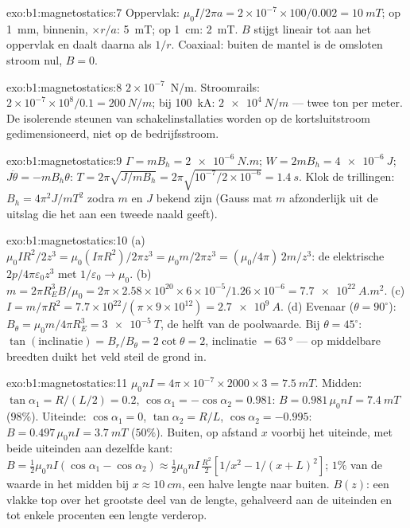 \begin{solution}{exo:b1:magnetostatics:7}
Oppervlak: $\mu_0I/2\pi a = 2 \times 10^{-7} \times 100/0.002 = \qty{10}{mT}$; op
\qty{1}{mm}, binnenin, $\times r/a$: \qty{5}{mT}; op \qty{1}{cm}: \qty{2}{mT}. $B$ stijgt
lineair tot aan het oppervlak en daalt daarna als $1/r$. Coaxiaal: buiten de mantel
is de omsloten stroom nul, $B = 0$.
\end{solution}

\begin{solution}{exo:b1:magnetostatics:8}
$2 \times 10^{-7}$~N/m. Stroomrails: $2 \times 10^{-7} \times 10^8/0.1 = \qty{200}{N/m}$;
bij \qty{100}{kA}: $\qty{2e4}{N/m}$ --- twee ton per meter. De isolerende
steunen van schakelinstallaties worden op de kortsluitstroom gedimensioneerd, niet op de
bedrijfsstroom.
\end{solution}

\begin{solution}{exo:b1:magnetostatics:9}
$\Gamma = mB_h = \qty{2e-6}{N.m}$; $W = 2mB_h = \qty{4e-6}{J}$; $J\ddot\theta =
-mB_h\theta$: $T = 2\pi\sqrt{J/mB_h} = 2\pi\sqrt{10^{-7}/2 \times 10^{-6}} =
\qty{1.4}{s}$. Klok de trillingen: $B_h = 4\pi^2J/mT^2$ zodra $m$ en $J$
bekend zijn (Gauss mat $m$ afzonderlijk uit de uitslag die het aan
een tweede naald geeft).
\end{solution}

\begin{solution}{exo:b1:magnetostatics:10}
(a) $\mu_0IR^2/2z^3 = \mu_0(I\pi R^2)/2\pi z^3 = \mu_0m/2\pi z^3 = (\mu_0/4\pi)\,2m/z^3$:
de elektrische $2p/4\pi\varepsilon_0z^3$ met $1/\varepsilon_0 \to \mu_0$. (b) $m = 2\pi R_E^3B/
\mu_0 = 2\pi \times 2.58 \times 10^{20} \times 6 \times 10^{-5}/1.26 \times 10^{-6} = \qty{7.7e22}{A.m^2}$.
(c) $I = m/\pi R^2 = 7.7 \times 10^{22}/(\pi \times 9 \times 10^{12}) = \qty{2.7e9}{A}$. (d)
Evenaar ($\theta = 90^\circ$): $B_\theta = \mu_0m/4\pi R_E^3 = \qty{3e-5}{T}$, de helft van de
poolwaarde. Bij $\theta = 45^\circ$: $\tan(\text{inclinatie}) = B_r/B_\theta = 2\cot\theta = 2$,
inclinatie $= \qty{63}{\degree}$ --- op middelbare breedten duikt het veld steil de grond in.
\end{solution}

\begin{solution}{exo:b1:magnetostatics:11}
$\mu_0nI = 4\pi \times 10^{-7} \times 2000 \times 3 = \qty{7.5}{mT}$. Midden: $\tan\alpha_1 =
R/(L/2) = 0.2$, $\cos\alpha_1 = -\cos\alpha_2 = 0.981$: $B = 0.981\,\mu_0nI =
\qty{7.4}{mT}$ ($98\%$). Uiteinde: $\cos\alpha_1 = 0$, $\tan\alpha_2 = R/L$, $\cos\alpha_2 =
-0.995$: $B = 0.497\,\mu_0nI = \qty{3.7}{mT}$ ($50\%$). Buiten, op afstand $x$ voorbij het
uiteinde, met beide uiteinden aan dezelfde kant: $B = \tfrac12\mu_0nI(\cos\alpha_1 - \cos\alpha_2)
\approx \tfrac12\mu_0nI\,\tfrac{R^2}{2}[1/x^2 - 1/(x + L)^2]$; $1\%$ van de waarde in het
midden bij $x \approx \qty{10}{cm}$, een halve lengte naar buiten. $B(z)$: een vlakke top over
het grootste deel van de lengte, gehalveerd aan de uiteinden en tot enkele procenten een
lengte verderop.
\end{solution}

